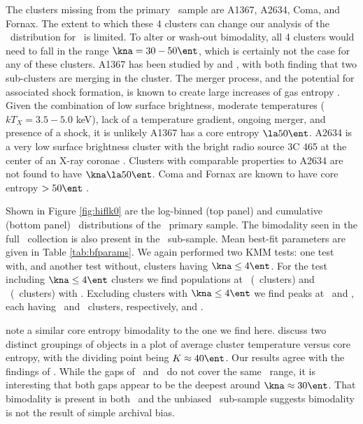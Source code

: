 \documentclass{emulateapj}
\begin{document}
The clusters missing from the primary \hifl\ sample are A1367, A2634,
Coma, and Fornax. The extent to which these 4 clusters can change our
analysis of the \kna\ distribution for \hifl\ is limited.  To alter or
wash-out bimodality, all 4 clusters would need to fall in the range
$\kna = 30-50 \ent$, which is certainly not the case for any of these
clusters. A1367 has been studied by \citet{1998ApJ...500..138D} and
\citet{2002ApJ...576..708S}, with both finding that two sub-clusters
are merging in the cluster. The merger process, and the potential for
associated shock formation, is known to create large increases of gas
entropy \citep{2007MNRAS.376..497M}. Given the combination of low
surface brightness, moderate temperatures ($kT_X = 3.5-5.0$ keV), lack
of a temperature gradient, ongoing merger, and presence of a shock, it
is unlikely A1367 has a core entropy $\la 50 \ent$. A2634 is a very
low surface brightness cluster with the bright radio source 3C 465 at
the center of an X-ray coronae \citep{coronae}. Clusters with
comparable properties to A2634 are not found to have $\kna \la 50
\ent$. Coma and Fornax are known to have core entropy $> 50 \ent$
\citep[][C. Scharf, private communication]{2008arXiv0802.1864R}.

Shown in Figure \ref{fig:hiflk0} are the log-binned (top panel) and
cumulative (bottom panel) \kna\ distributions of the \hifl\ primary
sample. The bimodality seen in the full \accept\ collection is also
present in the \hifl\ sub-sample. Mean best-fit parameters are given
in Table \ref{tab:bfparams}. We again performed two KMM tests: one
test with, and another test without, clusters having $\kna \le 4
\ent$. For the test including $\kna \le 4 \ent$ clusters we find
populations at \hiflkmma\ (\hiflkmmc\ clusters) and
\hiflkmmb\ (\hiflkmmd\ clusters) with \hiflkmme. Excluding clusters
with $\kna \le 4 \ent$ we find peaks at \hiflkmmf\ and \hiflkmmg, each
having \hiflkmmh\ and \hiflkmmi\ clusters, respectively, and
\hiflkmmj.

\citet{2007hvcg.conf...42H} note a similar core entropy bimodality to
the one we find here. \citet{2007hvcg.conf...42H} discuss two distinct
groupings of objects in a plot of average cluster temperature versus
core entropy, with the dividing point being $K \approx 40 \ent$. Our
results agree with the findings of \citet{2007hvcg.conf...42H}. While
the gaps of \accept\ and \hifl\ do not cover the same \kna\ range, it
is interesting that both gaps appear to be the deepest around $\kna
\approx 30 \ent$. That bimodality is present in both \accept\ and the
unbiased \hifl\ sub-sample suggests bimodality is not the result of
simple archival bias.
\end{document}
